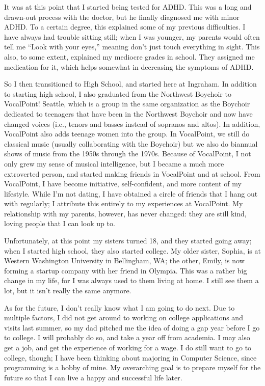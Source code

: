 \documentclass[12pt, letter]{article}
\begin{document}
	It was at this point that I started being tested for ADHD. This was a long and drawn-out process with the doctor, but he finally diagnosed me with minor ADHD. To a certain degree, this explained some of my previous difficulties. I have always had trouble sitting still; when I was younger, my parents would often tell me ``Look with your eyes,'' meaning don't just touch everything in sight. This also, to some extent, explained my mediocre grades in school. They assigned me medication for it, which helps somewhat in decreasing the symptoms of ADHD.
	
	So I then transitioned to High School, and started here at Ingraham. In addition to starting high school, I also graduated from the Northwest Boychoir to VocalPoint! Seattle, which is a group in the same organization as the Boychoir dedicated to teenagers that have been in the Northwest Boychoir and now have changed voices (i.e., tenors and basses instead of sopranos and altos). In addition, VocalPoint also adds teenage women into the group. In VocalPoint, we still do classical music (usually collaborating with the Boychoir) but we also do biannual shows of music from the 1950s through the 1970s. Because of VocalPoint, I not only grew my sense of musical intelligence, but I became a much more extroverted person, and started making friends in VocalPoint and at school. From VocalPoint, I have become initiative, self-confident, and more content of my lifestyle. While I'm not dating, I have obtained a circle of friends that I hang out with regularly; I attribute this entirely to my experiences at VocalPoint. My relationship with my parents, however, has never changed: they are still kind, loving people that I can look up to.
	
	Unfortunately, at this point my sisters turned 18, and they started going away; when I started high school, they also started college. My older sister, Sophia, is at Western Washington University in Bellingham, WA; the other, Emily, is now forming a startup company with her friend in Olympia. This was a rather big change in my life, for I was always used to them living at home. I still see them a lot, but it isn't really the same anymore.
	
	As for the future, I don't really know what I am going to do next. Due to multiple factors, I did not get around to working on college applications and visits last summer, so my dad pitched me the idea of doing a gap year before I go to college. I will probably do so, and take a year off from academia. I may also get a job, and get the experience of working for a wage. I do still want to go to college, though; I have been thinking about majoring in Computer Science, since programming is a hobby of mine. My overarching goal is to prepare myself for the future so that I can live a happy and successful life later.
	
\end{document}

